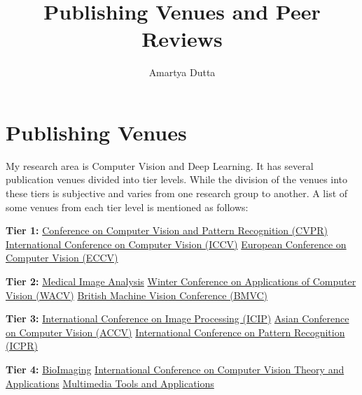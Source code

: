 \documentclass[11pt]{article}
\title{\textbf{Publishing Venues and Peer Reviews}}
\author{Amartya Dutta}
\date{}
\begin{document}
\clearpage\maketitle
\thispagestyle{empty}
\section{Publishing Venues}
My research area is Computer Vision and Deep Learning. It has several publication venues divided into tier levels. While the division of the venues into these tiers is subjective and varies from one research group to another. A list of some venues from each tier level is mentioned as follows: \newline
\item{\textbf{Tier 1:}} \newline
\href{https://cvpr.thecvf.com/}{Conference on Computer Vision and Pattern Recognition (CVPR)} \newline
\href{https://iccv2023.thecvf.com/}{International Conference on Computer Vision (ICCV)} \newline
\href{https://eccv2022.ecva.net/}{European Conference on Computer Vision (ECCV)} \newline
\item{\textbf{Tier 2:}} \newline
\href{https://www.sciencedirect.com/journal/medical-image-analysis}{Medical Image Analysis} \newline
\href{https://wacv2023.thecvf.com/home}{Winter Conference on Applications of Computer Vision (WACV)} \newline
\href{https://britishmachinevisionassociation.github.io/bmvc}{British Machine Vision Conference (BMVC)} \newline
\item{\textbf{Tier 3:}} \newline
\href{https://2023.ieeeicip.org/#:~:text=IEEE%20ICIP%20is%20the%20world's,video%20processing%20and%20computer%20vision.}{International Conference on Image Processing (ICIP)} \newline
\href{https://www.accv2022.org/en/}{Asian Conference on Computer Vision (ACCV)} \newline
\href{https://www.icpr2022.com/}{International Conference on Pattern Recognition (ICPR)} \newline
\item{\textbf{Tier 4:}} \newline
\href{https://bioimaging.scitevents.org/}{BioImaging} \newline
\href{https://visapp.scitevents.org/}{International Conference on Computer Vision Theory and Applications} \newline
\href{https://www.springer.com/journal/11042}{Multimedia Tools and Applications} \newline
\end{document}
